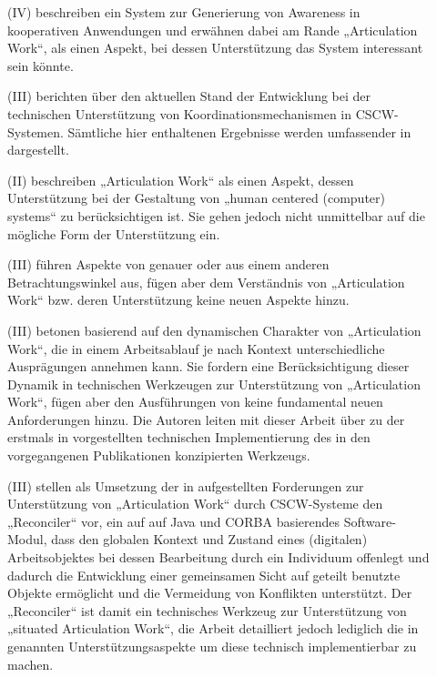 \begin{description}
	\item[\citet{Simone97}] (IV) beschreiben ein System zur Generierung von Awareness in kooperativen Anwendungen und erwähnen dabei am Rande „Articulation Work“, als einen Aspekt, bei dessen Unterstützung das System interessant sein könnte.
	\item[\citet{Simone97a}] (III) berichten über den aktuellen Stand der Entwicklung bei der technischen Unterstützung von Koordinationsmechanismen in CSCW-Systemen. Sämtliche hier enthaltenen Ergebnisse werden umfassender in \citep{Divitini00} dargestellt.
	\item[\citet{Kling98}] (II) beschreiben „Articulation Work“ als einen Aspekt, dessen Unterstützung bei der Gestaltung von „human centered (computer) systems“ zu berücksichtigen ist. Sie gehen jedoch nicht unmittelbar auf die mögliche Form der Unterstützung ein.
	\item[\citet{Carstensen99}] (III) führen Aspekte von \citep{Schmidt96} genauer oder aus einem anderen Betrachtungswinkel aus, fügen aber dem Verständnis von „Articulation Work“ bzw. deren Unterstützung keine neuen Aspekte hinzu.
	\item[\citet{Schmidt99}] (III) betonen basierend auf \citep{Schmidt96} den dynamischen Charakter von „Articulation Work“, die in einem Arbeitsablauf je nach Kontext unterschiedliche Ausprägungen annehmen kann. Sie fordern eine Berücksichtigung dieser Dynamik in technischen Werkzeugen zur Unterstützung von „Articulation Work“, fügen aber den Ausführungen von \citep{Schmidt96} keine fundamental neuen Anforderungen hinzu. Die Autoren leiten mit dieser Arbeit über zu der erstmals in \citet{Simone99} vorgestellten technischen Implementierung des in den vorgegangenen Publikationen konzipierten Werkzeugs.
	\item[\citet{Simone99}] (III) stellen als Umsetzung der in \citep{Schmidt96} aufgestellten Forderungen zur Unterstützung von „Articulation Work“ durch \gls{CSCW}-Systeme den „Reconciler“ vor, ein auf auf Java und \gls{CORBA} basierendes Software-Modul, dass den globalen Kontext und Zustand eines (digitalen) Arbeitsobjektes bei dessen Bearbeitung durch ein Individuum offenlegt und dadurch die Entwicklung einer gemeinsamen Sicht auf geteilt benutzte Objekte ermöglicht und die Vermeidung von Konflikten unterstützt. Der „Reconciler“ ist damit ein technisches Werkzeug zur Unterstützung von „situated Articulation Work“, die Arbeit detailliert jedoch lediglich die in \citep{Schmidt96} genannten Unterstützungsaspekte um diese technisch implementierbar zu machen.

\end{description}
